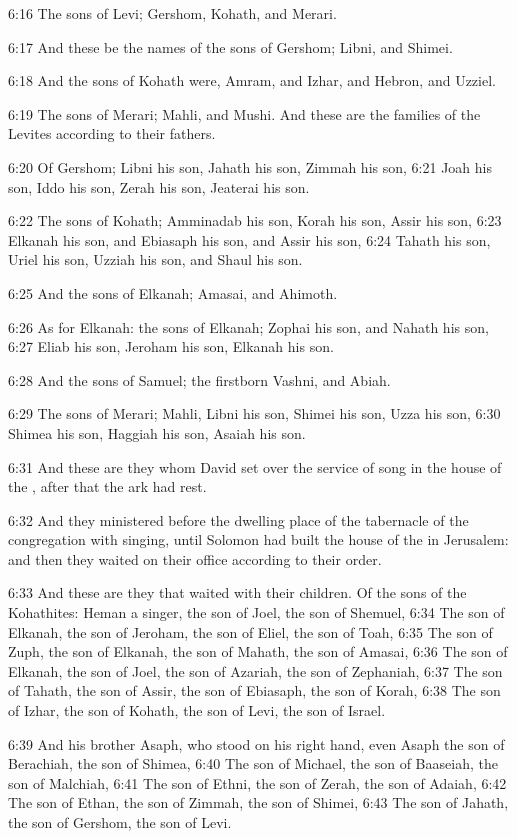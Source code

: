 6:16 The sons of Levi; Gershom, Kohath, and Merari.

6:17 And these be the names of the sons of Gershom; Libni, and Shimei.

6:18 And the sons of Kohath were, Amram, and Izhar, and Hebron, and Uzziel.

6:19 The sons of Merari; Mahli, and Mushi. And these are the families of the Levites according to their fathers.

6:20 Of Gershom; Libni his son, Jahath his son, Zimmah his son, 6:21 Joah his son, Iddo his son, Zerah his son, Jeaterai his son.

6:22 The sons of Kohath; Amminadab his son, Korah his son, Assir his son, 6:23 Elkanah his son, and Ebiasaph his son, and Assir his son, 6:24 Tahath his son, Uriel his son, Uzziah his son, and Shaul his son.

6:25 And the sons of Elkanah; Amasai, and Ahimoth.

6:26 As for Elkanah: the sons of Elkanah; Zophai his son, and Nahath his son, 6:27 Eliab his son, Jeroham his son, Elkanah his son.

6:28 And the sons of Samuel; the firstborn Vashni, and Abiah.

6:29 The sons of Merari; Mahli, Libni his son, Shimei his son, Uzza his son, 6:30 Shimea his son, Haggiah his son, Asaiah his son.

6:31 And these are they whom David set over the service of song in the house of the \LORD, after that the ark had rest.

6:32 And they ministered before the dwelling place of the tabernacle of the congregation with singing, until Solomon had built the house of the \LORD in Jerusalem: and then they waited on their office according to their order.

6:33 And these are they that waited with their children. Of the sons of the Kohathites: Heman a singer, the son of Joel, the son of Shemuel, 6:34 The son of Elkanah, the son of Jeroham, the son of Eliel, the son of Toah, 6:35 The son of Zuph, the son of Elkanah, the son of Mahath, the son of Amasai, 6:36 The son of Elkanah, the son of Joel, the son of Azariah, the son of Zephaniah, 6:37 The son of Tahath, the son of Assir, the son of Ebiasaph, the son of Korah, 6:38 The son of Izhar, the son of Kohath, the son of Levi, the son of Israel.

6:39 And his brother Asaph, who stood on his right hand, even Asaph the son of Berachiah, the son of Shimea, 6:40 The son of Michael, the son of Baaseiah, the son of Malchiah, 6:41 The son of Ethni, the son of Zerah, the son of Adaiah, 6:42 The son of Ethan, the son of Zimmah, the son of Shimei, 6:43 The son of Jahath, the son of Gershom, the son of Levi.

